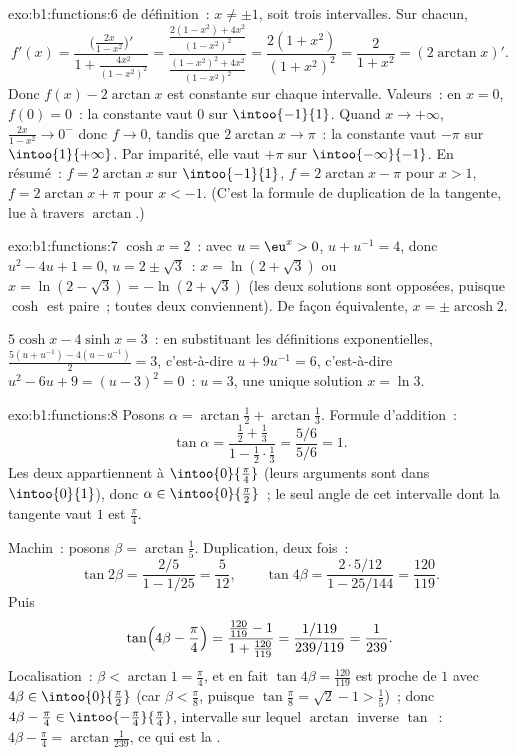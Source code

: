\begin{solution}{exo:b1:functions:6}
 de définition~: $x \neq \pm 1$, soit trois intervalles. Sur
chacun,
\[
f'(x) = \frac{\bigl(\frac{2x}{1-x^2}\bigr)'}{1 +
\frac{4x^2}{(1-x^2)^2}}
= \frac{\frac{2(1-x^2) + 4x^2}{(1-x^2)^2}}
{\frac{(1-x^2)^2 + 4x^2}{(1-x^2)^2}}
= \frac{2(1 + x^2)}{(1 + x^2)^2} = \frac{2}{1 + x^2}
= (2\arctan x)' .
\]
Donc $f(x) - 2\arctan x$ est constante sur chaque intervalle. Valeurs~:
en $x = 0$, $f(0) = 0$~: la constante vaut $0$ sur $\intoo{-1}{1}$.
Quand $x \to +\infty$, $\frac{2x}{1-x^2} \to 0^-$ donc $f \to 0$,
tandis que $2\arctan x \to \pi$~: la constante vaut $-\pi$ sur
$\intoo{1}{+\infty}$. Par imparité, elle vaut $+\pi$ sur
$\intoo{-\infty}{-1}$. En résumé~: $f = 2\arctan x$ sur
$\intoo{-1}{1}$, $f = 2\arctan x - \pi$ pour $x > 1$, $f = 2\arctan x
+ \pi$ pour $x < -1$. (C'est la formule de duplication de la tangente,
lue à travers $\arctan$.)
\end{solution}

\begin{solution}{exo:b1:functions:7}
$\cosh x = 2$~: avec $u = \eu^x > 0$, $u + u^{-1} = 4$, donc $u^2 - 4u
+ 1 = 0$, $u = 2 \pm \sqrt 3$~: $x = \ln(2 + \sqrt 3)$ ou $x = \ln(2 -
\sqrt 3) = -\ln(2 + \sqrt 3)$ (les deux solutions sont opposées,
puisque $\cosh$ est paire~; toutes deux conviennent). De façon
équivalente, $x = \pm \operatorname{arcosh} 2$.

$5\cosh x - 4\sinh x = 3$~: en substituant les définitions
exponentielles, $\frac{5(u + u^{-1}) - 4(u - u^{-1})}{2} = 3$,
c'est-à-dire $u + 9u^{-1} = 6$, c'est-à-dire $u^2 - 6u + 9 = (u -
3)^2 = 0$~: $u = 3$, une unique solution $x = \ln 3$.
\end{solution}

\begin{solution}{exo:b1:functions:8}
Posons $\alpha = \arctan\frac12 + \arctan\frac13$. Formule
d'addition~:
\[
\tan\alpha = \frac{\frac12 + \frac13}{1 - \frac12\cdot\frac13}
= \frac{5/6}{5/6} = 1 .
\]
Les deux  appartiennent à $\intoo{0}{\frac\pi4}$ (leurs
arguments sont dans $\intoo{0}{1}$), donc $\alpha \in
\intoo{0}{\frac\pi2}$~; le seul angle de cet intervalle dont la
tangente vaut $1$ est $\frac\pi4$.

Machin~: posons $\beta = \arctan\frac15$. Duplication, deux fois~:
\[
\tan 2\beta = \frac{2/5}{1 - 1/25} = \frac{5}{12},
\qquad
\tan 4\beta = \frac{2 \cdot 5/12}{1 - 25/144} = \frac{120}{119}.
\]
Puis
\[
\tan\Bigl(4\beta - \frac\pi4\Bigr)
= \frac{\frac{120}{119} - 1}{1 + \frac{120}{119}}
= \frac{1/119}{239/119} = \frac{1}{239}.
\]
Localisation~: $\beta < \arctan 1 = \frac\pi4$, et en fait
$\tan 4\beta = \frac{120}{119}$ est proche de $1$ avec $4\beta \in
\intoo{0}{\frac\pi2}$ (car $\beta < \frac\pi8$, puisque
$\tan\frac\pi8 = \sqrt 2 - 1 > \frac15$)~; donc $4\beta - \frac\pi4
\in \intoo{-\frac\pi4}{\frac\pi4}$, intervalle sur lequel $\arctan$
inverse $\tan$~: $4\beta - \frac\pi4 = \arctan\frac{1}{239}$, ce qui
est la .
\end{solution}

